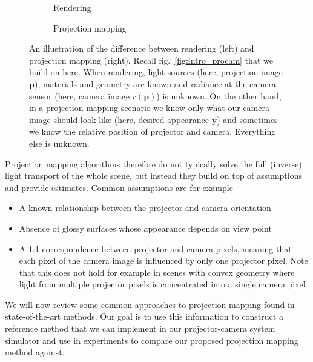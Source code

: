 \begin{figure}[ht]
    \centering
    \begin{subfigure}[b]{0.48\textwidth}
        \centering
        \def\svgwidth{\textwidth}
        
        \caption{Rendering}
    \end{subfigure}
    \hfill
    \begin{subfigure}[b]{0.48\textwidth}
        \centering
        \def\svgwidth{\textwidth}
        
        \caption{Projection mapping}
    \end{subfigure}
    \caption{An illustration of the difference between rendering (left) and projection mapping (right). Recall fig.~\ref{fig:intro_procam} that we build on here. When rendering, light sources (here, projection image \(\bm{p}\)), materials and geometry are known and radiance at the camera sensor (here, camera image \(r(\bm{p})\)) is unknown. On the other hand, in a projection mapping scenario we know only what our camera image should look like (here, desired appearance \(\bm{y}\)) and sometimes we know the relative position of projector and camera. Everything else is unknown.}
    \label{fig:background_proj_map_vs_rendering}
\end{figure}

Projection mapping algorithms therefore do not typically solve the full (inverse) light transport of the whole scene, but instead they build on top of assumptions and provide estimates. Common assumptions are for example

\begin{itemize}
    \item A known relationship between the projector and camera orientation
    \item Absence of glossy surfaces whose appearance depends on view point
    \item A 1:1 correspondence between projector and camera pixels, meaning that each pixel of the camera image is influenced by only one projector pixel. Note that this does not hold for example in scenes with convex geometry where light from multiple projector pixels is concentrated into a single camera pixel
\end{itemize}

We will now review some common approaches to projection mapping found in state-of-the-art methods. Our goal is to use this information to construct a reference method that we can implement in our projector-camera system simulator and use in experiments to compare our proposed projection mapping method against.

